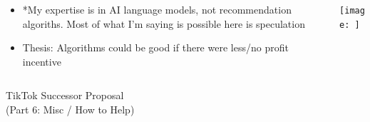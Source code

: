 \documentclass[aspectratio=169]{beamer}
\begin{document}
\begin{frame}{}
\begin{columns}[T]
    \begin{column}[T]{0.5\textwidth}
        \begin{itemize}
            \item *My expertise is in AI language models, not recommendation algoriths. Most of what I'm saying is possible here is speculation
            \item Thesis: Algorithms could be good if there were less/no profit incentive
        \end{itemize}
    \end{column}
    \begin{column}{0.5\textwidth}
        \texttt{[image: ]}
    \end{column}
\end{columns}
\end{frame}

\begin{frame}
    \centering
    \Huge TikTok Successor Proposal \\
    \Huge (Part 6: Misc / How to Help)
\end{frame}
\end{document}
